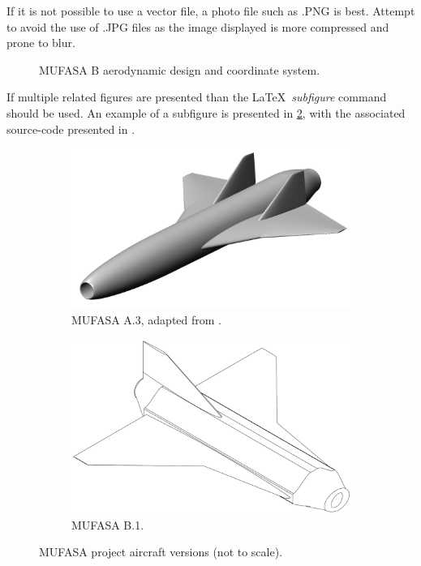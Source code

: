 If it is not possible to use a vector file, a photo file such as .PNG is best. 
Attempt to avoid the use of .JPG files as the image displayed is more compressed and prone to blur. 


\begin{figure}[hbt!]
	\centering
	\captionsetup{width=0.7\textwidth}
	\def\svgwidth{0.7\textwidth}
	
	\caption{MUFASA B aerodynamic design and coordinate system.}
	\label{fig:mufasaB2}
	\hfill
\end{figure}



If multiple related figures are presented than the \LaTeX\ \textit{subfigure} command should be used. 
An example of a subfigure is presented in \cref{fig:aircraftComparison}, with the associated source-code presented in . 

\begin{figure}[hbt!]
	\centering
	\begin{subfigure}{0.48\textwidth}
		\centering
		\captionsetup{width=0.95\linewidth}
		\includegraphics[width=0.95\linewidth]{Photos/Aircraft/MUFASA_Gair}
		\caption{MUFASA A.3, adapted from \citeauthor{ShaunThesis} \cite{ShaunThesis}.}
	\end{subfigure}
	\begin{subfigure}{0.48\textwidth}
		\centering
		\captionsetup{width=0.95\linewidth}
		\includegraphics[width=0.95\linewidth]{Photos/Aircraft/MUFASA_ISO}
		\caption{MUFASA B.1.}
	\end{subfigure}
	\caption{MUFASA project aircraft versions (not to scale). \label{fig:aircraftComparison}}
\end{figure}

